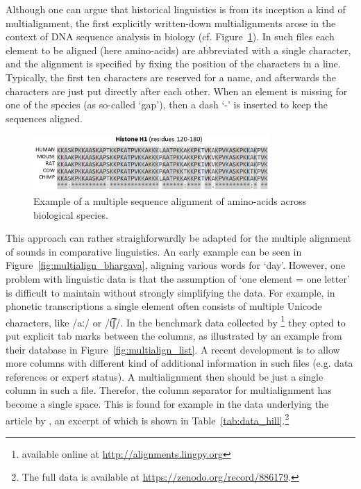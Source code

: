 \documentclass[11pt]{article}
\begin{document}
Although one can argue that historical linguistics is from its inception a kind of multialignment, the first explicitly written-down multialignments arose in the context of DNA sequence analysis in biology (cf. Figure~\ref{fig:aminoacids}). In such files each element to be aligned (here amino-acids) are abbreviated with a single character, and the alignment is specified by fixing the position of the characters in a line. Typically, the first ten characters are reserved for a name, and afterwards the characters are just put directly after each other. When an element is missing for one of the species (as so-called `gap'), then a dash `-' is inserted to keep the sequences aligned.

\begin{figure}[htbp] 
	\centering
	\includegraphics[width=0.8\textwidth]{images/Histone_Alignment.png}
 	\caption{Example of a multiple sequence alignment of amino-acids across biological species.\protect\footnotemark}
	\label{fig:aminoacids}
\end{figure}

This approach can rather straighforwardly be adapted for the multiple alignment of sounds in comparative linguistics. An early example can be seen in Figure~\ref{fig:multialign_bhargava}, aligning various words for `day'. However, one problem with linguistic data is that the assumption of `one element = one letter' is difficult to maintain without strongly simplifying the data. For example, in phonetic transcriptions a single element often consists of multiple Unicode characters, like /aː/ or /t͡ʃ/. In the benchmark data collected by \textcite{list2014benchmark}\footnote{available online at \url{http://alignments.lingpy.org}} they opted to put explicit tab marks between the columns, as illustrated by an example from their database in Figure~\ref{fig:multialign_list}. A recent development is to allow more columns with different kind of additional information in such files (e.g. data references or expert status). A multialignment then should be just a single column in such a file. Therefor, the column separator for multialignment has become a single space. This is found for example in the data underlying the article by \textcite{hill2017}, an excerpt of which is shown in Table~\ref{tab:data_hill}.\footnote{The full data is available at \url{https://zenodo.org/record/886179}.}
\end{document}
